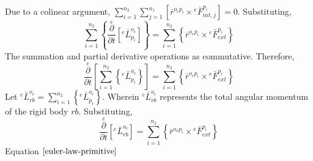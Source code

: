 \documentclass[class=report, 12pt, crop=false]{standalone}
\begin{document}
\begin{center}
Due to a colinear argument, $\displaystyle \sum^{n_{2}}_{i = 1}  \sum^{n_{1}}_{j = 1}\left[\bar{r}^{o_{e}p_{i}}\times{}^{e}\bar{F}^{p_{i}}_{int,j}\right] = 0$. Substituting,
$$\sum^{n_{2}}_{i = 1}\left\{ \overset{e}{\frac{\partial}{\partial t}}\left[{}^{e}\bar{L}^{o_{e}}_{p_{i}}\right]\right\} = \sum^{n_{2}}_{i = 1}\left\{ \bar{r}^{o_{e}p_{i}}\times{}^{e}\bar{F}^{p_{i}}_{ext}\right\}$$
The summation and partial derivative operations as commutative. Therefore,
$$\overset{e}{\frac{\partial}{\partial t}}\left[\sum^{n_{2}}_{i = 1}\left\{{}^{e}\bar{L}^{o_{e}}_{p_{i}}\right\}\right] = \sum^{n_{2}}_{i = 1}\left\{ \bar{r}^{o_{e}p_{i}}\times{}^{e}\bar{F}^{p_{i}}_{ext}\right\}$$
Let $\displaystyle {}^{e}\bar{L}^{o_{e}}_{rb} = \sum^{n_{2}}_{i = 1}\left\{{}^{e}\bar{L}^{o_{e}}_{p_{i}}\right\}$. Wherein $\displaystyle {}^{e}\bar{L}^{o_{e}}_{rb}$ represents the total angular momentum of the rigid body $rb$. Substituting,
\begin{equation}\overset{e}{\frac{\partial}{\partial t}}\left[{}^{e}\bar{L}^{o_{e}}_{rb}\right] = \sum^{n_{2}}_{i = 1}\left\{ \bar{r}^{o_{e}p_{i}}\times{}^{e}\bar{F}^{p_{i}}_{ext}\right\}\label{euler-law-primitive}\end{equation}
Equation $\ref{euler-law-primitive}$ 


\end{center}
\end{document}
